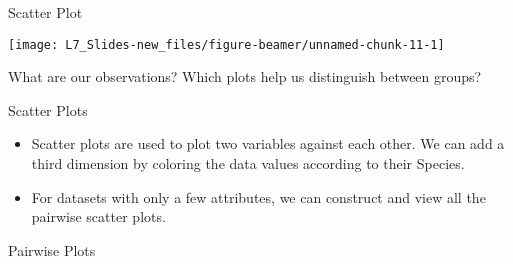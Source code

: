 \documentclass[ignorenonframetext,]{beamer}
\newenvironment{Shaded}{\begin{snugshade}}{\end{snugshade}}
\newcommand{\KeywordTok}[1]{\textcolor[rgb]{0.13,0.29,0.53}{\textbf{{#1}}}}
\newcommand{\DataTypeTok}[1]{\textcolor[rgb]{0.13,0.29,0.53}{{#1}}}
\newcommand{\DecValTok}[1]{\textcolor[rgb]{0.00,0.00,0.81}{{#1}}}
\newcommand{\StringTok}[1]{\textcolor[rgb]{0.31,0.60,0.02}{{#1}}}
\newcommand{\NormalTok}[1]{{#1}}
\begin{document}
\begin{frame}[fragile]{Scatter Plot}

\small

\begin{Shaded}
\end{Shaded}

\begin{center}\texttt{[image: L7\_Slides-new\_files/figure-beamer/unnamed-chunk-11-1]} \end{center}

What are our observations? Which plots help us distinguish between
groups?

\end{frame}

\begin{frame}{Scatter Plots}

\begin{itemize}
\item
  Scatter plots are used to plot two variables against each other. We
  can add a third dimension by coloring the data values according to
  their Species.
\item
  For datasets with only a few attributes, we can construct and view all
  the pairwise scatter plots.
\end{itemize}

\end{frame}

\begin{frame}[fragile]{Pairwise Plots}

\small

\begin{Shaded}
\end{Shaded}

\end{frame}
\end{document}

